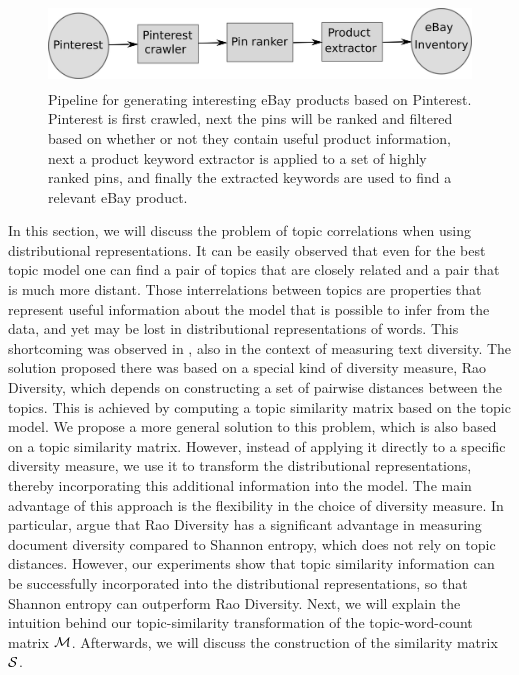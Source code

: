 \begin{figure}
\centering
\includegraphics[height=2.2cm]{figures/pinterest-pipeline.png}
\caption{Pipeline for generating interesting eBay products based on Pinterest. Pinterest is first crawled, next the pins will be ranked and filtered based on whether or not they contain useful product information, next a product keyword extractor is applied to a set of highly ranked pins, and finally the extracted keywords are used to find a relevant eBay product.}
\label{fig:pinterest-pipeline}
\end{figure}

In this section, we will discuss the problem of topic
correlations when using distributional representations. It can be easily observed 
that even for the best topic model one can find a
pair of topics that are closely related and a pair that is much more
distant. Those interrelations between topics are 
properties that represent useful information about the model that is
possible to infer from the data, and yet
may be lost in distributional representations of words. 
This shortcoming was observed in \cite{bache:2013},
also in the context of measuring text diversity. The solution proposed
there was based on a special kind of diversity measure, Rao Diversity,
which depends on constructing a set of pairwise distances between the
topics. This is achieved by computing a topic similarity matrix based on
the topic model. We propose a more general solution to this problem,
which is also based on a topic similarity matrix. However, instead of
applying it directly to a specific diversity measure, we use it to
transform the distributional representations, thereby incorporating this
additional information into the model. The main advantage of this
approach is the flexibility in the choice of diversity measure. In
particular, \cite{bache:2013} argue that Rao Diversity has a
significant advantage in measuring document diversity compared to
Shannon entropy, which does not rely on topic distances. However, our
experiments show that topic similarity information can be successfully
incorporated into the distributional representations, so that Shannon
entropy can outperform Rao Diversity.  Next, we will explain the
intuition behind our topic-similarity transformation of the
topic-word-count matrix ${\mathcal M}$. Afterwards, we will discuss the
construction of the similarity matrix ${\mathcal S}$.

